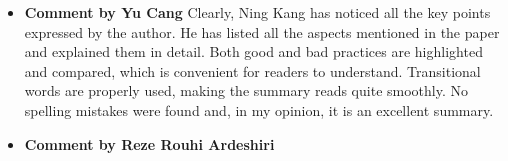 \documentclass[paper=a4, fontsize=11pt]{scrartcl} %
\numberwithin{equation}{section} %
\numberwithin{figure}{section} %
\numberwithin{table}{section} %
\begin{document}
		\begin{itemize}
			\item \textbf{Comment by Yu Cang} \newline
				Clearly, Ning Kang has noticed all the key points expressed by the author. He has listed all the aspects mentioned in the paper and explained them in detail. Both good and bad practices are highlighted and compared, which is convenient for readers to understand. Transitional words are properly used, making the summary reads quite smoothly. No spelling mistakes were found and, in my opinion, it is an excellent summary.
				
			\item \textbf{Comment by Reze Rouhi Ardeshiri} \newline
		
		\end{itemize}
	
\end{document}
